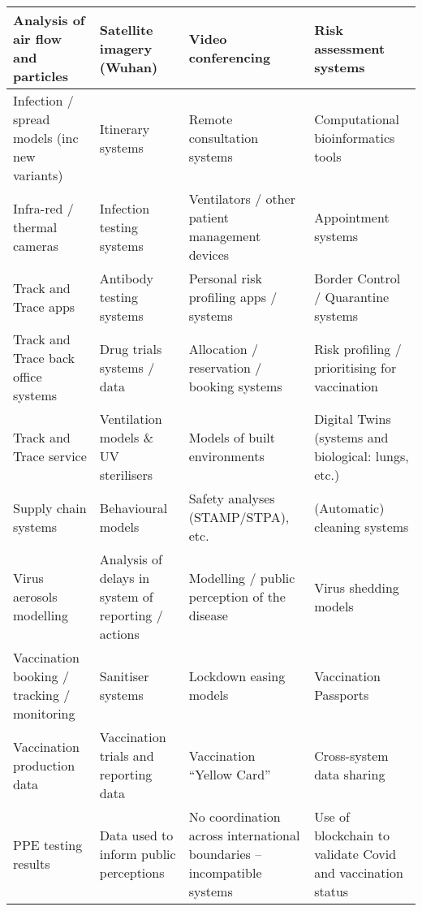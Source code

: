 \begin{longtable}{|L{}|L{}|L{}|L{}|}
  Analysis of air flow and particles & 
  Satellite imagery (Wuhan) &
  Video conferencing &
  Risk assessment systems\\\hline
  Infection / spread models (inc new variants) &
  Itinerary systems &
  Remote consultation systems &
  Computational bioinformatics tools\\\hline
  Infra-red / thermal cameras &
  Infection testing systems &
  Ventilators / other patient management devices &
  Appointment systems\\\hline
  Track and Trace apps &
  Antibody testing systems &
  Personal risk profiling apps / systems &
  Border Control / Quarantine systems\\\hline
  Track and Trace back office systems &
  Drug trials systems / data &
  Allocation / reservation / booking systems &
  Risk profiling / prioritising for vaccination\\\hline
  Track and Trace service &
  Ventilation models \& UV sterilisers &
  Models of built environments &
  Digital Twins (systems and biological: lungs, etc.)\\\hline
  Supply chain systems &
  Behavioural models &
  Safety analyses (STAMP/STPA), etc. &
  (Automatic) cleaning systems\\\hline
  Virus aerosols modelling &
  Analysis of delays in system of reporting / actions &
  Modelling / public perception of the disease &
  Virus shedding models\\\hline
%
  Vaccination booking / tracking / monitoring &
  Sanitiser systems &
  Lockdown easing models &
  Vaccination Passports
  \\\hline
%
  Vaccination production data &
  Vaccination trials and reporting data &
  Vaccination ``Yellow Card'' &
  Cross-system data sharing
  \\\hline
%
  PPE testing results &
  Data used to inform public perceptions &
  No coordination across international boundaries -- incompatible systems &
  Use of blockchain to validate Covid and vaccination status\\
  \hline
\end{longtable}

